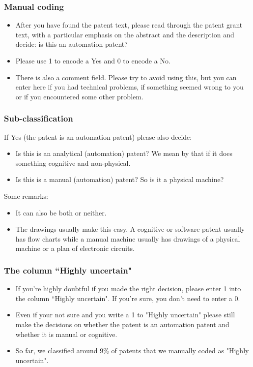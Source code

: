 \documentclass[10pt]{beamer}
\begin{document}
\begin{frame}\frametitle{Manual coding}
	\begin{itemize}	
	\item After you have found the patent text, please read through the patent grant text, with a particular emphasis on the abstract and the description and decide: is this an automation patent?
	\item Please use 1 to encode a Yes and 0 to encode a No.
	\item There is also a comment field. Please try to avoid using this, but you can enter here if you had technical problems, if something seemed wrong to you or if you encountered some other problem.
	\end{itemize}
\end{frame}


\begin{frame}\frametitle{Sub-classification}
If Yes (the patent is an automation patent) please also decide:
	\begin{itemize}
	\item Is this is an analytical (automation) patent? We mean by that if it does something cognitive and non-physical.
	\item Is this is a manual (automation) patent? So is it a physical machine?
	\end{itemize}
Some remarks:
\begin{itemize}
	\item It can also be both or neither.
	\item The drawings usually make this easy. A cognitive or software patent usually has flow charts while a manual machine usually has drawings of a physical machine or a plan of electronic circuits.
	\end{itemize}
\end{frame}


\begin{frame}\frametitle{The column ``Highly uncertain"}
\begin{itemize}
	\item If you're highly doubtful if you made the right decision, please enter 1 into the column ``Highly uncertain". If you're sure, you don't need to enter a 0.
	\item Even if your not sure and you write a 1 to "Highly uncertain" please still make the decisions on whether the patent is an automation patent and whether it is manual or cognitive.
	\item So far, we classified around 9\% of patents that we manually coded as "Highly uncertain".
\end{itemize}
\end{frame}
\end{document}

